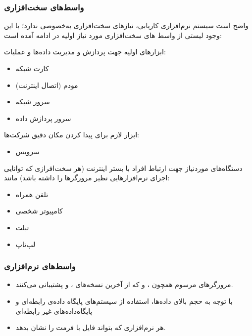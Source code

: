 \documentclass[12pt,svgnames,oneside]{book}
\newcounter{itemadded}
\let\LaTeXStandardEnumerateBegin\enumerate
\let\LaTeXStandardEnumerateEnd\endenumerate
\renewenvironment{enumerate}{%
	\LaTeXStandardEnumerateBegin%
	\setcounter{itemadded}{0}
}{%
	\LaTeXStandardEnumerateEnd%
}%
\begin{document}
				\subsubsection{واسط‌های سخت‌افزاری}
					واضح است سیستم نرم‌افزاری کاریابی، نیازهای سخت‌افزاری به‌خصوصی ندارد؛ با این وجود لیستی از واسط های سخت‌افزاری مورد نیاز اولیه در ادامه آمده است:
					\begin{enumerate}
						\item
						ابزارهای اولیه جهت پردازش و مدیریت داده‌ها و عملیات:
							\begin{itemize}
								\item
								کارت شبکه
								\item
								مودم (اتصال اینترنت)
								\item
								سرور شبکه
								\item
								سرور پردازش داده
							\end{itemize}

						\item
						ابزار لازم برای پیدا کردن مکان دقیق شرکت‌ها:
						\begin{itemize}
							\item
							سرویس 
						\end{itemize}

						\item
						دستگاه‌های موردنیاز جهت ارتباط افراد با بستر اینترنت (هر سخت‌افرازی که توانایی اجرای نرم‌افزارهایی نظیر مرورگرها را داشته باشد) مانند:
						\begin{itemize}
							\item تلفن همراه
							\item کامپیوتر شخصی
							\item تبلت
							\item لپ‌تاپ
						\end{itemize}

					\end{enumerate}
				\subsubsection{واسط‌های نرم‌افزاری}\label{software}
					\begin{itemize}
						\item
						مرورگر‌های مرسوم همچون
						،
						 و
						که از آخرین نسخه‌های
						،
						و
						پشتیبانی می‌کنند.

			            \item
			            با توجه به حجم بالای داده‌ها، استفاده از سیستم‌های پایگاه‌ داده‌ی رابطه‌ای  و پایگاه‌داده‌های غیر رابطه‌ای 
			            \item
			            هر نرم‌افزاری که بتواند فایل با فرمت  را نشان بدهد.
					\end{itemize}
\end{document}
